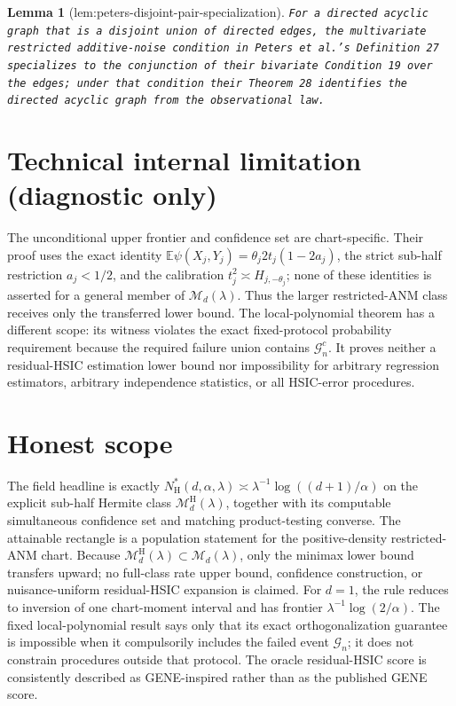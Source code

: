 \documentclass{article}
\newtheorem{lemma}{Lemma}
\begin{document}
\begin{lemma}[lem:peters-disjoint-pair-specialization]\label{lem:peters-disjoint-pair-specialization}
\texttt{For a directed acyclic graph that is a disjoint union of directed edges,\allowbreak{} the multivariate restricted additive-\allowbreak{}noise condition in Peters et al.'s Definition 27 specializes to the conjunction of their bivariate Condition 19 over the edges;\allowbreak{} under that condition their Theorem 28 identifies the directed acyclic graph from the observational law.}
\end{lemma}

\section*{Technical internal limitation (diagnostic only)}

The unconditional upper frontier and confidence set are chart-specific. Their proof uses the exact identity \(\mathbb E\psi(X_j,Y_j)=\theta_j2t_j(1-2a_j)\), the strict sub-half restriction \(a_j<1/2\), and the calibration \(t_j^2\asymp H_{j,-\theta_j}\); none of these identities is asserted for a general member of \(\mathcal M_d(\lambda)\). Thus the larger restricted-ANM class receives only the transferred lower bound. The local-polynomial theorem has a different scope: its witness violates the exact fixed-protocol probability requirement because the required failure union contains \(\mathcal G_n^c\). It proves neither a residual-HSIC estimation lower bound nor impossibility for arbitrary regression estimators, arbitrary independence statistics, or all HSIC-error procedures.

\section{Honest scope}

The field headline is exactly \(N_{\mathrm H}^*(d,\alpha,\lambda)\asymp\lambda^{-1}\log((d+1)/\alpha)\) on the explicit sub-half Hermite class \(\mathcal M_d^{\mathrm H}(\lambda)\), together with its computable simultaneous confidence set and matching product-testing converse. The attainable rectangle is a population statement for the positive-density restricted-ANM chart. Because \(\mathcal M_d^{\mathrm H}(\lambda)\subset\mathcal M_d(\lambda)\), only the minimax lower bound transfers upward; no full-class rate upper bound, confidence construction, or nuisance-uniform residual-HSIC expansion is claimed. For \(d=1\), the rule reduces to inversion of one chart-moment interval and has frontier \(\lambda^{-1}\log(2/\alpha)\). The fixed local-polynomial result says only that its exact orthogonalization guarantee is impossible when it compulsorily includes the failed event \(\mathcal G_n\); it does not constrain procedures outside that protocol. The oracle residual-HSIC score is consistently described as GENE-inspired rather than as the published GENE score.
\end{document}
